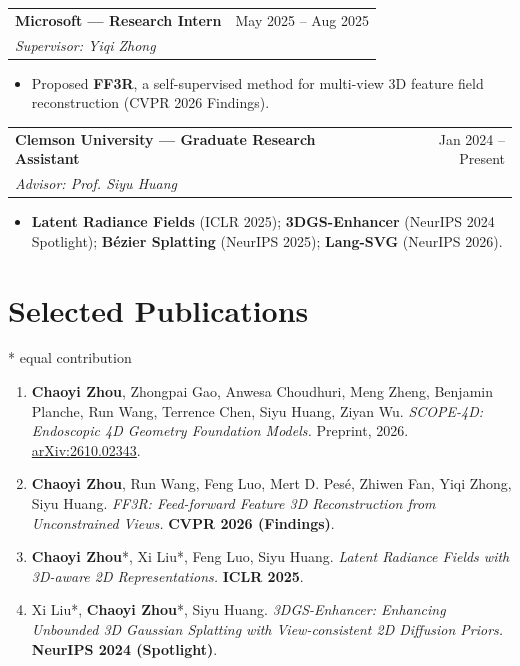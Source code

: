 \documentclass[letterpaper,10pt]{article}
\makeatletter
\newcommand{\when}[1]{{\color{muted}#1}}
\newcommand{\resumeSubheading}[4]{%
  \par\vspace{3pt}\noindent
  \begin{tabular*}{\textwidth}[t]{@{}l@{\extracolsep{\fill}}r@{}}
    \textbf{#1} & \when{#2} \\
    \textit{#3} & \textit{\color{muted}#4} \\
  \end{tabular*}\par}
\newcommand{\resumeItem}[1]{\item #1}
\newcommand{\resumeItemListStart}{\begin{itemize}}
\newcommand{\resumeItemListEnd}{\end{itemize}}
\newcommand{\venue}[1]{\textbf{\color{accent}#1}}
\newcommand{\me}{\textbf{Chaoyi Zhou}}
\makeatother
\begin{document}
  \resumeSubheading
    {Microsoft --- Research Intern}{May 2025 -- Aug 2025}
    {Supervisor: Yiqi Zhong}{}
  \resumeItemListStart
    \resumeItem{Proposed \textbf{FF3R}, a self-supervised method for multi-view 3D feature field reconstruction (CVPR 2026 Findings).}
  \resumeItemListEnd

  \resumeSubheading
    {Clemson University --- Graduate Research Assistant}{Jan 2024 -- Present}
    {Advisor: Prof. Siyu Huang}{}
  \resumeItemListStart
    \resumeItem{\textbf{Latent Radiance Fields} (ICLR 2025); \textbf{3DGS-Enhancer} (NeurIPS 2024 Spotlight); \textbf{B\'ezier Splatting} (NeurIPS 2025); \textbf{Lang-SVG} (NeurIPS 2026).}
  \resumeItemListEnd

\section{Selected Publications}
{\small\color{muted}* equal contribution}\vspace{2pt}
\begin{enumerate}

\item \me, Zhongpai Gao, Anwesa Choudhuri, Meng Zheng, Benjamin Planche, Run Wang, Terrence Chen, Siyu Huang, Ziyan Wu.
\textit{SCOPE-4D: Endoscopic 4D Geometry Foundation Models.}
{\color{muted}Preprint, 2026.} \href{https://arxiv.org/abs/2610.02343}{arXiv:2610.02343}.

\item \me, Run Wang, Feng Luo, Mert D. Pes\'e, Zhiwen Fan, Yiqi Zhong, Siyu Huang.
\textit{FF3R: Feed-forward Feature 3D Reconstruction from Unconstrained Views.}
\venue{CVPR 2026 (Findings)}.

\item \me*, Xi Liu*, Feng Luo, Siyu Huang.
\textit{Latent Radiance Fields with 3D-aware 2D Representations.}
\venue{ICLR 2025}.

\item Xi Liu*, \me*, Siyu Huang.
\textit{3DGS-Enhancer: Enhancing Unbounded 3D Gaussian Splatting with View-consistent 2D Diffusion Priors.}
\venue{NeurIPS 2024 (Spotlight)}.

\end{enumerate}
\end{document}
